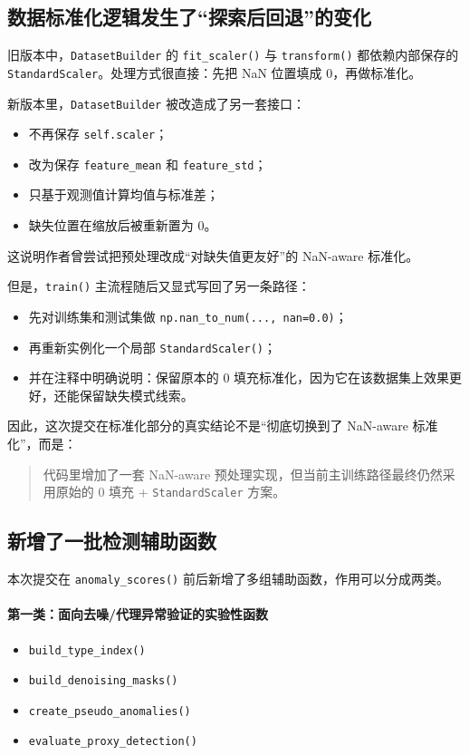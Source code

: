 \documentclass[UTF8]{ctexart}
\begin{document}
\subsection{数据标准化逻辑发生了“探索后回退”的变化}

旧版本中，\texttt{DatasetBuilder} 的 \texttt{fit\_scaler()} 与 \texttt{transform()} 都依赖内部保存的 \texttt{StandardScaler}。处理方式很直接：先把 NaN 位置填成 0，再做标准化。

新版本里，\texttt{DatasetBuilder} 被改造成了另一套接口：
\begin{itemize}
    \item 不再保存 \texttt{self.scaler}；
    \item 改为保存 \texttt{feature\_mean} 和 \texttt{feature\_std}；
    \item 只基于观测值计算均值与标准差；
    \item 缺失位置在缩放后被重新置为 0。
\end{itemize}

这说明作者曾尝试把预处理改成“对缺失值更友好”的 NaN-aware 标准化。

但是，\texttt{train()} 主流程随后又显式写回了另一条路径：
\begin{itemize}
    \item 先对训练集和测试集做 \texttt{np.nan\_to\_num(..., nan=0.0)}；
    \item 再重新实例化一个局部 \texttt{StandardScaler()}；
    \item 并在注释中明确说明：保留原本的 0 填充标准化，因为它在该数据集上效果更好，还能保留缺失模式线索。
\end{itemize}

因此，这次提交在标准化部分的真实结论不是“彻底切换到了 NaN-aware 标准化”，而是：
\begin{quote}
代码里增加了一套 NaN-aware 预处理实现，但当前主训练路径最终仍然采用原始的 0 填充 + \texttt{StandardScaler} 方案。
\end{quote}

\subsection{新增了一批检测辅助函数}

本次提交在 \texttt{anomaly\_scores()} 前后新增了多组辅助函数，作用可以分成两类。

\paragraph{第一类：面向去噪/代理异常验证的实验性函数}
\begin{itemize}
    \item \texttt{build\_type\_index()}
    \item \texttt{build\_denoising\_masks()}
    \item \texttt{create\_pseudo\_anomalies()}
    \item \texttt{evaluate\_proxy\_detection()}
\end{itemize}
\end{document}
